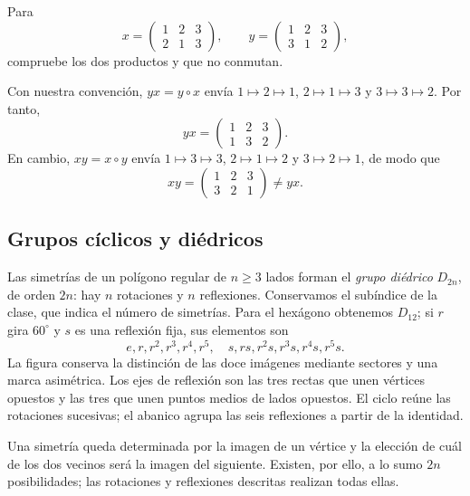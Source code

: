 \begin{ejer}\label{ejer:C2-permutaciones}
Para
\[
x=\begin{pmatrix}1&2&3\\2&1&3\end{pmatrix},\qquad
y=\begin{pmatrix}1&2&3\\3&1&2\end{pmatrix},
\]
compruebe los dos productos y que no conmutan.
\end{ejer}
\begin{sol}
Con nuestra convención, $yx=y\circ x$ envía $1\mapsto2\mapsto1$, $2\mapsto1\mapsto3$ y $3\mapsto3\mapsto2$. Por tanto,
\[
yx=\begin{pmatrix}1&2&3\\1&3&2\end{pmatrix}.
\]
En cambio, $xy=x\circ y$ envía $1\mapsto3\mapsto3$, $2\mapsto1\mapsto2$ y $3\mapsto2\mapsto1$, de modo que
\[
xy=\begin{pmatrix}1&2&3\\3&2&1\end{pmatrix}\ne yx.
\]
\end{sol}

\subsection{Grupos cíclicos y diédricos}
Las simetrías de un polígono regular de $n\ge3$ lados forman el \emph{grupo diédrico} $D_{2n}$, de orden $2n$: hay $n$ rotaciones y $n$ reflexiones. Conservamos el subíndice de la clase, que indica el número de simetrías. Para el hexágono obtenemos $D_{12}$; si $r$ gira $60^\circ$ y $s$ es una reflexión fija, sus elementos son
\[
e,r,r^2,r^3,r^4,r^5,\quad s,rs,r^2s,r^3s,r^4s,r^5s.
\]
La figura conserva la distinción de las doce imágenes mediante sectores y una marca asimétrica. Los ejes de reflexión son las tres rectas que unen vértices opuestos y las tres que unen puntos medios de lados opuestos. El ciclo reúne las rotaciones sucesivas; el abanico agrupa las seis reflexiones a partir de la identidad.
\begin{center}\end{center}
Una simetría queda determinada por la imagen de un vértice y la elección de cuál de los dos vecinos será la imagen del siguiente. Existen, por ello, a lo sumo $2n$ posibilidades; las rotaciones y reflexiones descritas realizan todas ellas.

